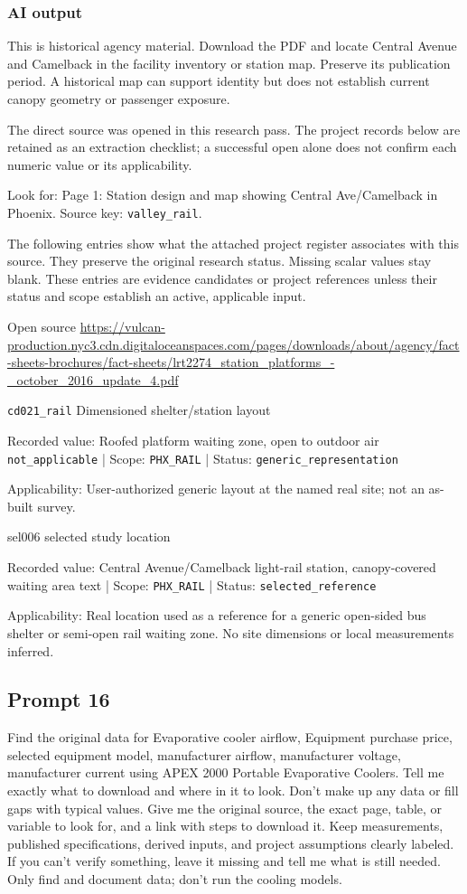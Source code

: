 \subsubsection*{AI output}
This is historical agency material. Download the PDF and locate Central Avenue and Camelback in the facility inventory or station map. Preserve its publication period. A historical map can support identity but does not establish current canopy geometry or passenger exposure.

The direct source was opened in this research pass. The project records below are retained as an extraction checklist; a successful open alone does not confirm each numeric value or its applicability.

Look for: Page 1: Station design and map showing Central Ave/Camelback in Phoenix. Source key: \nolinkurl{valley_rail}.

The following entries show what the attached project register associates with this source. They preserve the original research status. Missing scalar values stay blank. These entries are evidence candidates or project references unless their status and scope establish an active, applicable input.

Open source  \url{https://vulcan-production.nyc3.cdn.digitaloceanspaces.com/pages/downloads/about/agency/fact-sheets-brochures/fact-sheets/lrt2274_station_platforms_-_october_2016_update_4.pdf}

\nolinkurl{cd021_rail}  Dimensioned shelter/station layout

Recorded value: Roofed platform waiting zone, open to outdoor air \nolinkurl{not_applicable} | Scope: \nolinkurl{PHX_RAIL} | Status: \nolinkurl{generic_representation}

Applicability: User-authorized generic layout at the named real site; not an as-built survey.

sel006  selected study location

Recorded value: Central Avenue/Camelback light-rail station, canopy-covered waiting area text | Scope: \nolinkurl{PHX_RAIL} | Status: \nolinkurl{selected_reference}

Applicability: Real location used as a reference for a generic open-sided bus shelter or semi-open rail waiting zone. No site dimensions or local measurements inferred.

\subsection*{Prompt 16}
Find the original data for Evaporative cooler airflow, Equipment purchase price, selected equipment model, manufacturer airflow, manufacturer voltage, manufacturer current using APEX 2000 Portable Evaporative Coolers. Tell me exactly what to download and where in it to look. Don’t make up any data or fill gaps with typical values. Give me the original source, the exact page, table, or variable to look for, and a link with steps to download it. Keep measurements, published specifications, derived inputs, and project assumptions clearly labeled. If you can’t verify something, leave it missing and tell me what is still needed. Only find and document data; don’t run the cooling models.

